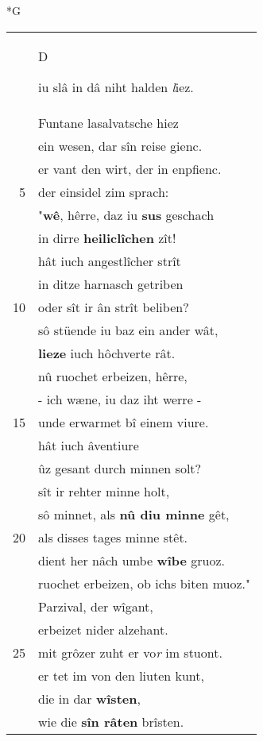 \documentclass[8pt,a4paper,notitlepage]{article}
\begin{document}
\begin{table}[ht]
\begin{minipage}[t]{0.5\linewidth}
\small
\begin{center}*G
\end{center}
\begin{tabular}{rl}
 & \begin{large}D\end{large}iu slâ in dâ niht halden \textit{l}iez.\\ 
 & Funtane lasalvatsche hiez\\ 
 & ein wesen, dar sîn reise gienc.\\ 
 & er vant den wirt, der in enpfienc.\\ 
5 & der einsidel zim sprach:\\ 
 & "\textbf{wê}, hêrre, daz iu \textbf{sus} geschach\\ 
 & in dirre \textbf{heiliclîchen} zît!\\ 
 & hât iuch angestlîcher strît\\ 
 & in ditze harnasch getriben\\ 
10 & oder sît ir ân strît beliben?\\ 
 & sô stüende iu baz ein ander wât,\\ 
 & \textbf{lieze} iuch hôchverte rât.\\ 
 & nû ruochet erbeizen, hêrre,\\ 
 & - ich wæne, iu daz iht werre -\\ 
15 & unde erwarmet bî einem viure.\\ 
 & hât iuch âventiure\\ 
 & ûz gesant durch minnen solt?\\ 
 & sît ir rehter minne holt,\\ 
 & sô minnet, als \textbf{nû diu minne} gêt,\\ 
20 & als disses tages minne stêt.\\ 
 & dient her nâch umbe \textbf{wîbe} gruoz.\\ 
 & ruochet erbeizen, ob ichs biten muoz."\\ 
 & Parzival, der wîgant,\\ 
 & erbeizet nider alzehant.\\ 
25 & mit grôzer zuht er vo\textit{r} im stuont.\\ 
 & er tet im von den liuten kunt,\\ 
 & die in dar \textbf{wîsten},\\ 
 & wie die \textbf{sîn râten} brîsten.\\ 

\end{tabular}
\end{minipage}
\end{table}
\end{document}
